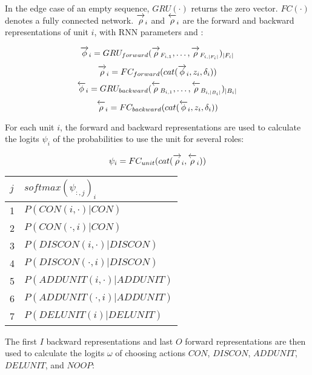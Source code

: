 \documentclass{article}[12px]
\newcommand{\ora}[1]{\overrightarrow{#1\vphantom{j}}}
\newcommand{\ola}[1]{\overleftarrow{#1\vphantom{j}}}
\begin{document}
In the edge case of an empty sequence, \(GRU(\cdot)\) returns the zero vector. \(FC(\cdot)\) denotes a fully connected network. \(\ora{\rho}_i\) and \(\ola{\rho}_i\) are the forward and backward representations of unit \(i\), with RNN parameters \ora{\theta} and \ola{\theta}:

\begin{equation}
  \ora{\phi}_i = GRU_{forward}(\ora{\rho}_{F_{i,1}}, \ldots, \ora{\rho}_{F_{i,|F_i|}})_{|F_i|}
\end{equation}
\begin{equation}
  \ora{\rho}_i = FC_{forward}(cat(\ora{\phi}_i, z_i, \delta_i))
\end{equation}
\begin{equation}
  \ola{\phi}_i = GRU_{backward}(\ola{\rho}_{B_{i,1}}, \ldots, \ola{\rho}_{B_{i,|B_i|}})_{|B_i|}
\end{equation}
\begin{equation}
  \ola{\rho}_i = FC_{backward}(cat(\ola{\phi}_i, z_i, \delta_i))
\end{equation}

For each unit \(i\), the forward and backward representations are used to calculate the logits \(\psi_i\) of the probabilities to use the unit for several roles:

\begin{equation}
  \psi_i = FC_{unit}(cat(\ora{\rho}_i, \ola{\rho}_i))
\end{equation}

\begin{center}
  \begin{tabular}{| l | l |}
    \hline
    \(j\) & \(softmax(\psi_{:,j})_i\) \\
    \hline
    1 & \(P(CON(i, \cdot) | CON)\) \\
    2 & \(P(CON(\cdot, i) | CON)\) \\
    3 & \(P(DISCON(i, \cdot) | DISCON)\) \\
    4 & \(P(DISCON(\cdot, i) | DISCON)\) \\
    5 & \(P(ADDUNIT(i, \cdot) | ADDUNIT)\) \\
    6 & \(P(ADDUNIT(\cdot, i) | ADDUNIT)\) \\
    7 & \(P(DELUNIT(i) | DELUNIT)\) \\
    \hline
  \end{tabular}
\end{center}

The first \(I\) backward representations and last \(O\) forward representations are then used to calculate the logits \(\omega\) of choosing actions \(CON\), \(DISCON\), \(ADDUNIT\), \(DELUNIT\), and \(NOOP\):
\end{document}
